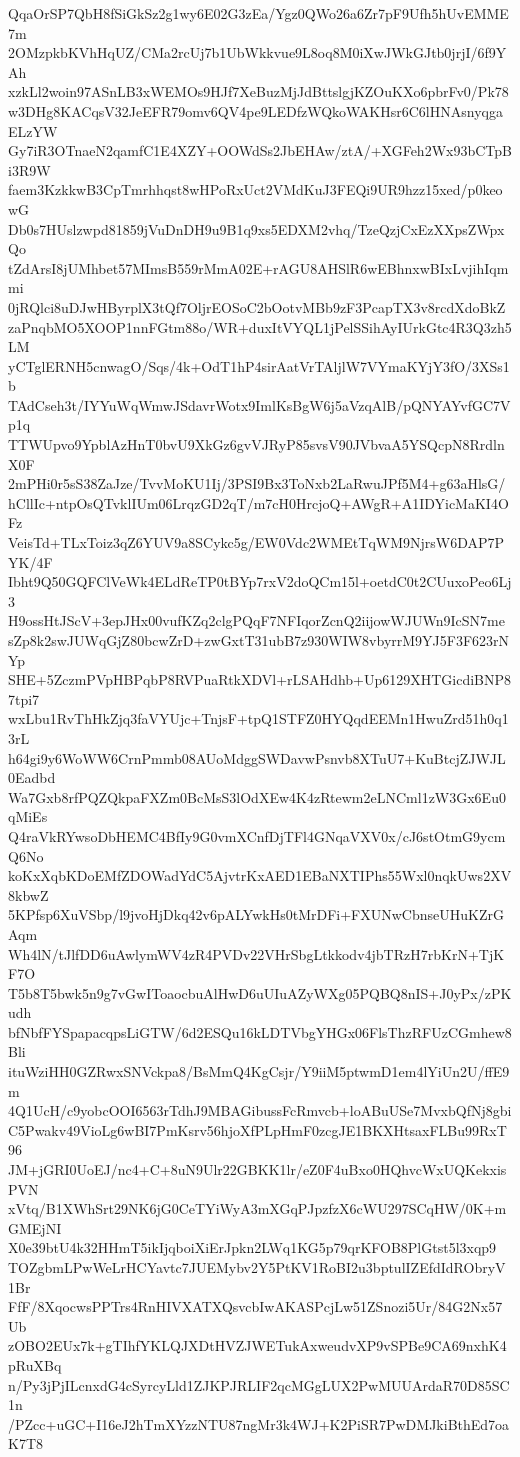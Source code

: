 QqaOrSP7QbH8fSiGkSz2g1wy6E02G3zEa/Ygz0QWo26a6Zr7pF9Ufh5hUvEMME7m
2OMzpkbKVhHqUZ/CMa2rcUj7b1UbWkkvue9L8oq8M0iXwJWkGJtb0jrjI/6f9YAh
xzkLl2woin97ASnLB3xWEMOs9HJf7XeBuzMjJdBttslgjKZOuKXo6pbrFv0/Pk78
w3DHg8KACqsV32JeEFR79omv6QV4pe9LEDfzWQkoWAKHsr6C6lHNAsnyqgaELzYW
Gy7iR3OTnaeN2qamfC1E4XZY+OOWdSs2JbEHAw/ztA/+XGFeh2Wx93bCTpBi3R9W
faem3KzkkwB3CpTmrhhqst8wHPoRxUct2VMdKuJ3FEQi9UR9hzz15xed/p0keowG
Db0s7HUslzwpd81859jVuDnDH9u9B1q9xs5EDXM2vhq/TzeQzjCxEzXXpsZWpxQo
tZdArsI8jUMhbet57MImsB559rMmA02E+rAGU8AHSlR6wEBhnxwBIxLvjihIqmmi
0jRQlci8uDJwHByrplX3tQf7OljrEOSoC2bOotvMBb9zF3PcapTX3v8rcdXdoBkZ
zaPnqbMO5XOOP1nnFGtm88o/WR+duxItVYQL1jPelSSihAyIUrkGtc4R3Q3zh5LM
yCTglERNH5cnwagO/Sqs/4k+OdT1hP4sirAatVrTAljlW7VYmaKYjY3fO/3XSs1b
TAdCseh3t/IYYuWqWmwJSdavrWotx9ImlKsBgW6j5aVzqAlB/pQNYAYvfGC7Vp1q
TTWUpvo9YpblAzHnT0bvU9XkGz6gvVJRyP85svsV90JVbvaA5YSQcpN8RrdlnX0F
2mPHi0r5sS38ZaJze/TvvMoKU1Ij/3PSI9Bx3ToNxb2LaRwuJPf5M4+g63aHlsG/
hCllIc+ntpOsQTvklIUm06LrqzGD2qT/m7cH0HrcjoQ+AWgR+A1IDYicMaKI4OFz
VeisTd+TLxToiz3qZ6YUV9a8SCykc5g/EW0Vdc2WMEtTqWM9NjrsW6DAP7PYK/4F
Ibht9Q50GQFClVeWk4ELdReTP0tBYp7rxV2doQCm15l+oetdC0t2CUuxoPeo6Lj3
H9ossHtJScV+3epJHx00vufKZq2clgPQqF7NFIqorZcnQ2iijowWJUWn9IcSN7me
sZp8k2swJUWqGjZ80bcwZrD+zwGxtT31ubB7z930WIW8vbyrrM9YJ5F3F623rNYp
SHE+5ZczmPVpHBPqbP8RVPuaRtkXDVl+rLSAHdhb+Up6129XHTGicdiBNP87tpi7
wxLbu1RvThHkZjq3faVYUjc+TnjsF+tpQ1STFZ0HYQqdEEMn1HwuZrd51h0q13rL
h64gi9y6WoWW6CrnPmmb08AUoMdggSWDavwPsnvb8XTuU7+KuBtcjZJWJL0Eadbd
Wa7Gxb8rfPQZQkpaFXZm0BcMsS3lOdXEw4K4zRtewm2eLNCml1zW3Gx6Eu0qMiEs
Q4raVkRYwsoDbHEMC4BfIy9G0vmXCnfDjTFl4GNqaVXV0x/cJ6stOtmG9ycmQ6No
koKxXqbKDoEMfZDOWadYdC5AjvtrKxAED1EBaNXTIPhs55Wxl0nqkUws2XV8kbwZ
5KPfsp6XuVSbp/l9jvoHjDkq42v6pALYwkHs0tMrDFi+FXUNwCbnseUHuKZrGAqm
Wh4lN/tJlfDD6uAwlymWV4zR4PVDv22VHrSbgLtkkodv4jbTRzH7rbKrN+TjKF7O
T5b8T5bwk5n9g7vGwIToaocbuAlHwD6uUIuAZyWXg05PQBQ8nIS+J0yPx/zPKudh
bfNbfFYSpapacqpsLiGTW/6d2ESQu16kLDTVbgYHGx06FlsThzRFUzCGmhew8Bli
ituWziHH0GZRwxSNVckpa8/BsMmQ4KgCsjr/Y9iiM5ptwmD1em4lYiUn2U/ffE9m
4Q1UcH/c9yobcOOI6563rTdhJ9MBAGibussFcRmvcb+loABuUSe7MvxbQfNj8gbi
C5Pwakv49VioLg6wBI7PmKsrv56hjoXfPLpHmF0zcgJE1BKXHtsaxFLBu99RxT96
JM+jGRI0UoEJ/nc4+C+8uN9Ulr22GBKK1lr/eZ0F4uBxo0HQhvcWxUQKekxisPVN
xVtq/B1XWhSrt29NK6jG0CeTYiWyA3mXGqPJpzfzX6cWU297SCqHW/0K+mGMEjNI
X0e39btU4k32HHmT5ikIjqboiXiErJpkn2LWq1KG5p79qrKFOB8PlGtst5l3xqp9
TOZgbmLPwWeLrHCYavtc7JUEMybv2Y5PtKV1RoBI2u3bptulIZEfdIdRObryV1Br
FfF/8XqocwsPPTrs4RnHIVXATXQsvcbIwAKASPcjLw51ZSnozi5Ur/84G2Nx57Ub
zOBO2EUx7k+gTIhfYKLQJXDtHVZJWETukAxweudvXP9vSPBe9CA69nxhK4pRuXBq
n/Py3jPjILcnxdG4cSyrcyLld1ZJKPJRLIF2qcMGgLUX2PwMUUArdaR70D85SC1n
/PZcc+uGC+I16eJ2hTmXYzzNTU87ngMr3k4WJ+K2PiSR7PwDMJkiBthEd7oaK7T8
